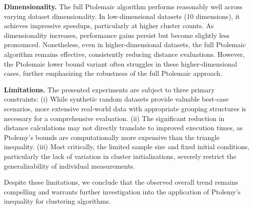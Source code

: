 \textbf{Dimensionality.} The full Ptolemaic algorithm performs reasonably well across varying dataset dimensionality. In low-dimensional datasets (10 dimensions), it achieves impressive speedups, particularly at higher cluster counts.
As dimensionality increases, performance gains persist but become slightly less pronounced.
Nonetheless, even in higher-dimensional datasets, the full Ptolemaic algorithm remains effective, consistently reducing distance evaluations.
However, the Ptolemaic lower bound variant often struggles in these higher-dimensional cases, further emphasizing the robustness of the full Ptolemaic approach.



\textbf{Limitations.}
The presented experiments are subject to three primary constraints:
(i) While synthetic random datasets provide valuable best-case scenarios, more extensive real-world data with appropriate grouping structures is necessary for a comprehensive evaluation.
(ii) The significant reduction in distance calculations may not directly translate to improved execution times, as Ptolemy's bounds are computationally more expensive than the triangle inequality.
(iii) Most critically, the limited sample size and fixed initial conditions, particularly the lack of variation in cluster initializations, severely restrict the generalizability of individual measurements.

Despite these limitations, we conclude that the observed overall trend remains compelling and warrants further investigation into the application of Ptolemy's inequality for clustering algorithms.


